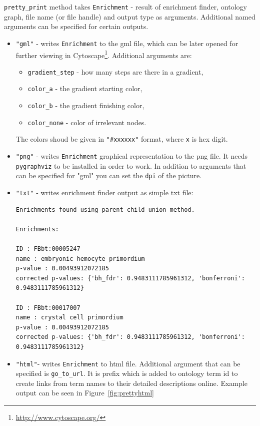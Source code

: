 \documentclass{report}
\begin{document}
\verb|pretty_print| method takes \verb|Enrichment| - result of enrichment finder, ontology graph,
file name (or file handle) and output type as arguments. Additional named
arguments can be specified for certain outputs.
\begin{itemize}
\item \verb|"gml"| - writes \verb|Enrichment| to the gml file, which can be later opened
for further viewing in Cytoscape\footnote{\url{http://www.cytoscape.org/}}.
Additional arguments are:
\begin{itemize}
\item \verb|gradient_step| - how many steps are there in a gradient,
\item \verb|color_a| - the gradient starting color,
\item \verb|color_b| - the gradient finishing color,
\item \verb|color_none| - color of irrelevant nodes.
\end{itemize}
The colors shoud be given in \verb|"#xxxxxx"| format, where \verb|x| is hex digit.
\item \verb|"png"| - writes \verb|Enrichment| graphical representation to the png file.
It needs \verb|pygraphviz| to be installed in order to work. In addition to arguments that
can be specified for "gml" you can set the \verb|dpi| of the picture.
\item \verb|"txt"| - writes enrichment finder output as simple txt file:
\begin{verbatim}
Enrichments found using parent_child_union method.

Enrichments:

ID : FBbt:00005247
name : embryonic hemocyte primordium
p-value : 0.00493912072185
corrected p-values: {'bh_fdr': 0.9483111785961312, 'bonferroni': 0.9483111785961312}

ID : FBbt:00017007
name : crystal cell primordium
p-value : 0.00493912072185
corrected p-values: {'bh_fdr': 0.9483111785961312, 'bonferroni': 0.9483111785961312}
\end{verbatim}
\item \verb|"html"|- writes \verb|Enrichment| to html file. Additional argument that
can be specified is \verb|go_to_url|. It is prefix which is added to ontology
term id to create links from term names to their detailed descriptions online.
Example output can be seen in Figure~\ref{fig:prettyhtml}
\end{itemize}

\begin{htmlonly}
\label{fig:prettyhtml}
\end{htmlonly}
\end{document}
